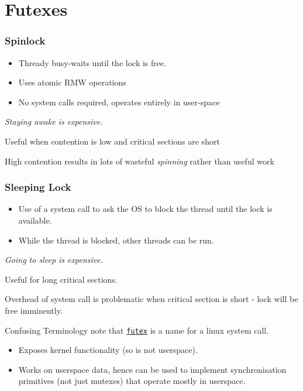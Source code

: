 \section{Futexes}
\begin{minipage}{.49\textwidth}
	\subsubsection{Spinlock}
	\begin{itemize}
		\item Thready busy-waits until the lock is free.
		\item Uses atomic RMW operations
		\item No system calls required, operates entirely in user-space
	\end{itemize}
	\textit{Staying awake is expensive.}
	\begin{prosbox}
		Useful when contention is low and critical sections are short
	\end{prosbox}
	\begin{consbox}
		High contention results in lots of wasteful \textit{spinning} rather than useful work
	\end{consbox}
\end{minipage}
\hfill
\begin{minipage}{.49\textwidth}
	\subsubsection{Sleeping Lock}
	\begin{itemize}
		\item Use of a system call to ask the OS to block the thread until the lock is available.
		\item While the thread is blocked, other threads can be run.
	\end{itemize}
	\textit{Going to sleep is expensive.}
	\begin{prosbox}
		Useful for long critical sections.
	\end{prosbox}
	\begin{consbox}
		Overhead of system call is problematic when critical section is short - lock will be free imminently.
	\end{consbox}
\end{minipage}
\begin{sidenotebox}{Confusing Terminology}
	note that \href{https://man7.org/linux/man-pages/man2/futex.2.html}{\texttt{futex}} is a name for a linux system call.
	\begin{itemize}
		\item Exposes kernel functionality (so is not userspace).
		\item Works on userspace data, hence can be used to implement synchronisation primitives (not just mutexes) that operate mostly in userspace.
	\end{itemize}
\end{sidenotebox}

